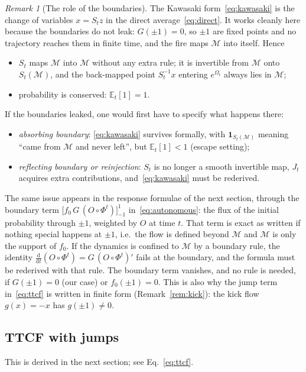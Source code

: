 \documentclass[11pt,a4paper]{article}
\theoremstyle{remark}
\newtheorem{remark}{Remark}
\newcommand{\E}{\mathbb{E}}
\newcommand{\M}{\mathcal{M}}
\newcommand{\one}{\mathbf{1}}
\newcommand{\dd}{\mathrm{d}}
\begin{document}
\begin{remark}[The role of the boundaries]\label{rem:boundaries}
The Kawasaki form~\eqref{eq:kawasaki} is the change of variables $x=S_tz$ in
the direct average~\eqref{eq:direct}. It works cleanly here because the
boundaries do not leak: $G(\pm1)=0$, so $\pm1$ are fixed points and no
trajectory reaches them in finite time, and the fire maps $\M$ into itself.
Hence
\begin{itemize}
\item $S_t$ maps $\M$ into $\M$ without any extra rule; it is invertible
  from $\M$ onto $S_t(\M)$, and the back-mapped point $S_t^{-1}x$ entering
  $e^{\Omega_t}$ always lies in $\M$;
\item probability is conserved: $\E_t[1]=1$.
\end{itemize}
If the boundaries leaked, one would first have to specify what happens there:
\begin{itemize}
\item \emph{absorbing boundary}: \eqref{eq:kawasaki} survives formally, with
  $\one_{S_t(\M)}$ meaning ``came from $\M$ and never left'', but
  $\E_t[1]<1$ (escape setting);
\item \emph{reflecting boundary or reinjection}: $S_t$ is no longer a smooth
  invertible map, $J_t$ acquires extra contributions, and~\eqref{eq:kawasaki}
  must be rederived.
\end{itemize}
The same issue appears in the response formulae of the next section, through
the boundary term $\big[f_0\,G\,(O\circ\Phi^t)\big]_{-1}^{1}$
in~\eqref{eq:autonomous}: the flux of the initial probability through
$\pm1$, weighted by $O$ at time $t$. That term is exact as written if nothing
special happens at $\pm1$, i.e.\ the flow is defined beyond $\M$ and $\M$ is
only the support of $f_0$. If the dynamics is confined to $\M$ by a boundary
rule, the identity $\frac{\dd}{\dd t}(O\circ\Phi^t)=G\,(O\circ\Phi^t)'$ fails
at the boundary, and the formula must be rederived with that rule. The
boundary term vanishes, and no rule is needed, if $G(\pm1)=0$ (our case) or
$f_0(\pm1)=0$. This is also why the jump term in~\eqref{eq:ttcf} is written in
finite form (Remark~\ref{rem:kick}): the kick flow $g(x)=-x$ has
$g(\pm1)\neq0$.
\end{remark}

\subsection{TTCF with jumps}
This is derived in the next section; see Eq.~\eqref{eq:ttcf}.
\end{document}
